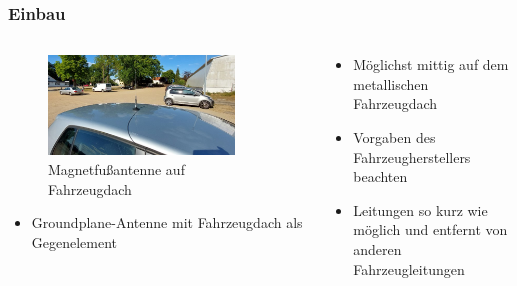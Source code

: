 \begin{frame}
\frametitle{Einbau}
\begin{columns}
    \begin{column}{0.48\textwidth}
    
\begin{figure}
    \includegraphics[width=0.85\textwidth]{foto/64}
    \caption{\scriptsize Magnetfußantenne auf Fahrzeugdach}
    \label{n_magnetfussantenne}
\end{figure}
\begin{itemize}
  \item Groundplane-Antenne mit Fahrzeugdach als Gegenelement
  \end{itemize}

    \end{column}
   \begin{column}{0.48\textwidth}
       \begin{itemize}
  \item Möglichst mittig auf dem metallischen Fahrzeugdach
  \item Vorgaben des Fahrzeugherstellers beachten
  \item Leitungen so kurz wie möglich und entfernt von anderen Fahrzeugleitungen
  \end{itemize}

   \end{column}
\end{columns}

\end{frame}


